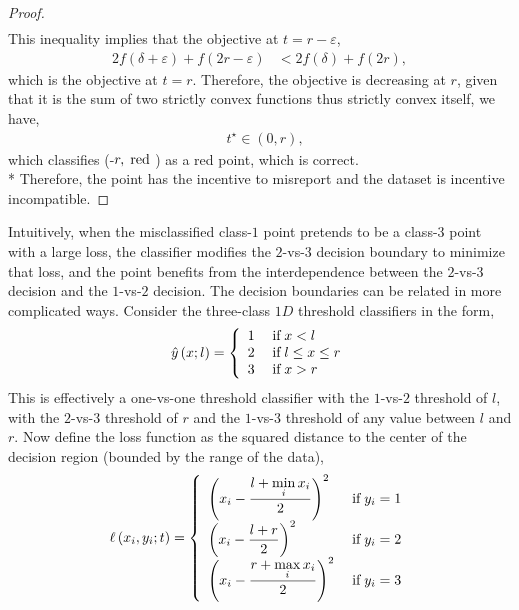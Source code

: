 \documentclass{article}
\begin{document}
\begin{proof}
\begin{align*}
\end{align*}
This inequality implies that the objective at $t  = r  - \varepsilon$,
\begin{align*}
2 f\left(\delta + \varepsilon\right) + f\left(2 r - \varepsilon\right) &< 2 f\left(\delta\right) + f\left(2 r \right),
\end{align*}
which is the objective at $t  = r $. Therefore, the objective is decreasing at $r $, given that it is the sum of two strictly convex functions thus strictly convex itself, we have,
\begin{align*}
&t^\star  \in \left(0, r \right),
\end{align*}
which classifies (-$r , \text{\;red\;}$) as a red point, which is correct.
\\* Therefore, the point has the incentive to misreport and the dataset is incentive incompatible.
\newline \newline\end{proof}
Intuitively, when the misclassified class-$1$ point pretends to be a class-$3$ point with a large loss, the classifier modifies the $2$-vs-$3$ decision boundary to minimize that loss, and the point benefits from the interdependence between the $2$-vs-$3$ decision and the $1$-vs-$2$ decision.
\newline \newline
The decision boundaries can be related in more complicated ways. Consider the three-class $1D$ threshold classifiers in the form,
\[ \hat{y}\left(x; l\right) =\left\{ \begin{array}{ll}
1& \text{\;if\;} x < l \\
2& \text{\;if\;} l \leq  x \leq  r \\
3& \text{\;if\;} x > r \\
\end{array}\right. \]
This is effectively a one-vs-one threshold classifier with the $1$-vs-$2$ threshold of $l $, with the $2$-vs-$3$ threshold of $r $ and the $1$-vs-$3$ threshold of any value between $l $ and $r $. Now define the loss function as the squared distance to the center of the decision region (bounded by the range of the data),
\[ \ell\left(x_{i}, y_{i}; t\right) =\left\{ \begin{array}{ll}
\left(x_{i} - \dfrac{l + \displaystyle\min_{i} x_{i}}{2}\right)^{2}& \text{\;if\;} y_{i} = 1 \\
\left(x_{i} - \dfrac{l + r}{2}\right)^{2}& \text{\;if\;} y_{i} = 2 \\
\left(x_{i} - \dfrac{r + \displaystyle\max_{i} x_{i}}{2}\right)^{2}& \text{\;if\;} y_{i} = 3 \\
\end{array}\right. \]
\end{document}
